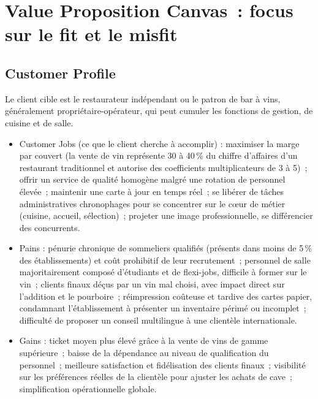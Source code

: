 \documentclass[12pt, a4paper]{article}
\begin{document}
\section{Value Proposition Canvas~: focus sur le fit et le misfit}

\subsection{Customer Profile}

Le client cible est le restaurateur indépendant ou le patron de bar à vins, généralement
propriétaire-opérateur, qui peut cumuler les fonctions de gestion, de cuisine et de salle.

\begin{itemize}[leftmargin=1.5em]
  \item Customer Jobs (ce que le client cherche à accomplir) :
        maximiser la marge par couvert (la vente de vin représente
        30 à 40\,\% du chiffre d'affaires d'un restaurant traditionnel et autorise des
        coefficients multiplicateurs de 3 à 5)~; offrir un service de qualité homogène
        malgré une rotation de personnel élevée~; maintenir une carte à jour en temps
        réel~; se libérer de tâches
        administratives chronophages pour se concentrer sur le cœur de métier (cuisine,
        accueil, sélection)~; projeter une image professionnelle, se
        différencier des concurrents.

  \item Pains :
        pénurie chronique de sommeliers qualifiés (présents dans moins de 5\,\% des
        établissements) et coût prohibitif de leur recrutement~; personnel de salle
        majoritairement composé d'étudiants et de flexi-jobs, difficile à former sur le
        vin~; clients finaux déçus par un vin mal choisi, avec impact direct sur
        l'addition et le pourboire~; réimpression coûteuse et tardive des cartes papier,
        condamnant l'établissement à présenter un inventaire périmé ou incomplet~;
        difficulté de proposer un conseil multilingue à une clientèle internationale.

  \item Gains :
        ticket moyen plus élevé grâce à la vente de vins de gamme supérieure~; baisse de la
        dépendance au niveau de qualification du personnel~; meilleure satisfaction et
        fidélisation des clients finaux~; visibilité sur les préférences réelles de la
        clientèle pour ajuster les achats de cave~; simplification opérationnelle
        globale.
\end{itemize}
\end{document}
